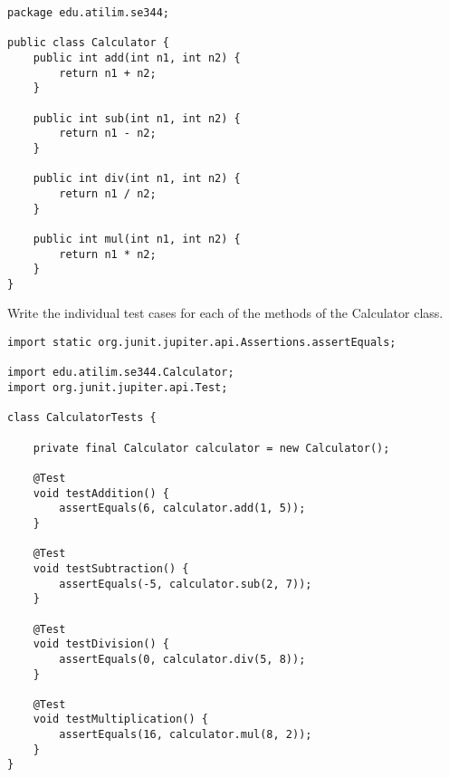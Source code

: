 \begin{lstlisting}[caption={A Calculator class implementation in Java.},label=lst:java-calc]
package edu.atilim.se344;

public class Calculator {
    public int add(int n1, int n2) {
        return n1 + n2;
    }
    
    public int sub(int n1, int n2) {
        return n1 - n2;
    }
    
    public int div(int n1, int n2) {
        return n1 / n2;
    }
    
    public int mul(int n1, int n2) {
        return n1 * n2;
    }
}
\end{lstlisting}

\begin{exercise}
    Write the individual test cases for each of the methods of the Calculator class.


    \begin{lstlisting}[caption={Trivial unit tests for the Calculator class.}]
import static org.junit.jupiter.api.Assertions.assertEquals;

import edu.atilim.se344.Calculator;
import org.junit.jupiter.api.Test;

class CalculatorTests {

    private final Calculator calculator = new Calculator();

    @Test
    void testAddition() {
        assertEquals(6, calculator.add(1, 5));
    }
    
    @Test
    void testSubtraction() {
        assertEquals(-5, calculator.sub(2, 7));
    }
    
    @Test
    void testDivision() {
        assertEquals(0, calculator.div(5, 8));
    }
    
    @Test
    void testMultiplication() {
        assertEquals(16, calculator.mul(8, 2));
    }
}
    \end{lstlisting}
\end{exercise}

